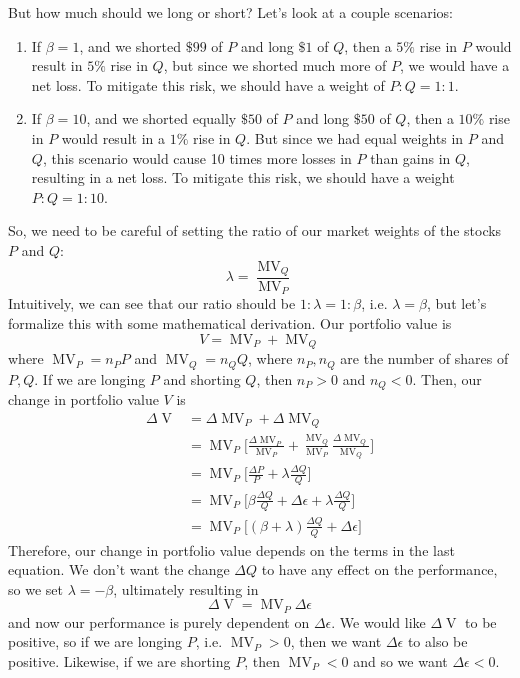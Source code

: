 \documentclass{article}
\DeclareMathOperator{\MV}{MV}
\DeclareMathOperator{\V}{V}
\begin{document}
      But how much should we long or short? Let's look at a couple scenarios: 
      \begin{enumerate}
          \item If $\beta = 1$, and we shorted $\$99$ of $P$ and long $\$1$ of $Q$, then a $5\%$ rise in $P$ would result in $5\%$ rise in $Q$, but since we shorted much more of $P$, we would have a net loss. To mitigate this risk, we should have a weight of $P:Q = 1:1$. 
          \item If $\beta = 10$, and we shorted equally $\$50$ of $P$ and long $\$50$ of $Q$, then a $10\%$ rise in $P$ would result in a $1\%$ rise in $Q$. But since we had equal weights in $P$ and $Q$, this scenario would cause 10 times more losses in $P$ than gains in $Q$, resulting in a net loss. To mitigate this risk, we should have a weight $P:Q = 1:10$. 
      \end{enumerate}
      So, we need to be careful of setting the ratio of our market weights of the stocks $P$ and $Q$: 
      \[\lambda = \frac{\MV_Q}{\MV_P}\]
      Intuitively, we can see that our ratio should be $1: \lambda = 1:\beta$, i.e. $\lambda = \beta$, but let's formalize this with some mathematical derivation. Our portfolio value is 
      \[V = \MV_P + \MV_Q\]
      where $\MV_P = n_P P$ and $\MV_Q = n_Q Q$, where $n_P, n_Q$ are the number of shares of $P, Q$. If we are longing $P$ and shorting $Q$, then $n_P > 0$ and $n_Q < 0$. Then, our change in portfolio value $V$ is 
      \begin{align*}
          \Delta \V & = \Delta \MV_P + \Delta \MV_Q \\
          & = \MV_P \bigg[\frac{\Delta \MV_P}{\MV_P} + \frac{\MV_Q}{\MV_P} \frac{\Delta \MV_Q}{\MV_Q}  \bigg] \\
          & = \MV_P \bigg[ \frac{\Delta P}{P} + \lambda \frac{\Delta Q}{Q} \bigg] \\
          & = \MV_P \bigg[ \beta \frac{\Delta Q}{Q} + \Delta \epsilon + \lambda \frac{\Delta Q}{Q} \bigg] \\
          & = \MV_P \bigg[ (\beta + \lambda) \frac{\Delta Q}{Q} + \Delta \epsilon \bigg] 
      \end{align*}
      Therefore, our change in portfolio value depends on the terms in the last equation. We don't want the change $\Delta Q$ to have any effect on the performance, so we set $\lambda = - \beta$, ultimately resulting in 
      \[\Delta \V = \MV_P \Delta \epsilon\]
      and now our performance is purely dependent on $\Delta \epsilon$. We would like $\Delta \V$ to be positive, so if we are longing $P$, i.e. $\MV_P > 0$, then we want $\Delta \epsilon$ to also be positive. Likewise, if we are shorting $P$, then $\MV_P < 0$ and so we want $\Delta \epsilon < 0$. 
\end{document}
